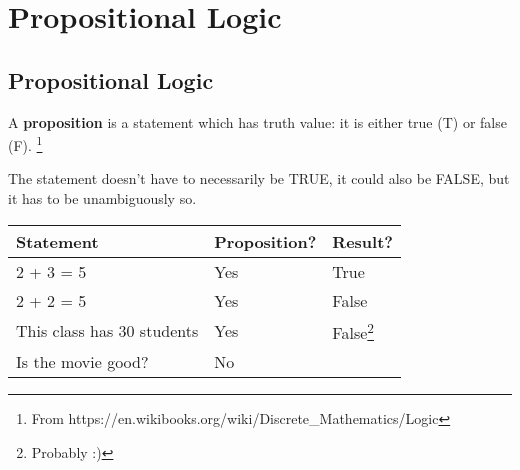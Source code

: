 
\newcommand{\laClass}       {CS 210}
\newcommand{\laSemester}    {Spring 2018}
\newcommand{\laChapter}     {1.3}
\newcommand{\laType}        {Exercise}
\newcommand{\laPoints}      {5}
\newcommand{\laTitle}       {Propositional Logic}
\newcommand{\laDate}        {}
\setcounter{chapter}{1}
\setcounter{section}{3}
\addtocounter{section}{-1}

\toggletrue{answerkey}
\togglefalse{answerkey}






    \section{\laTitle}

    \subsection{Propositional Logic}

    \begin{introNOHEAD}{}
        A \textbf{proposition} is a statement which has truth value: it is either true (T) or false (F).
        \footnote{From https://en.wikibooks.org/wiki/Discrete\_Mathematics/Logic}

        The statement doesn't have to necessarily be TRUE, it could also
        be FALSE, but it has to be unambiguously so. ~\\

        \begin{tabular}{ | l | l | l | }
            \hline
            \textbf{Statement} & \textbf{Proposition?} & \textbf{Result?}
            \\ \hline
            2 + 3 = 5 & Yes & True
            \\ \hline
            2 + 2 = 5 & Yes & False
            \\ \hline
            This class has 30 students & Yes & False\footnote{Probably :)}
            \\ \hline
            Is the movie good? & No &
            \\ \hline
        \end{tabular}
    \end{introNOHEAD}

